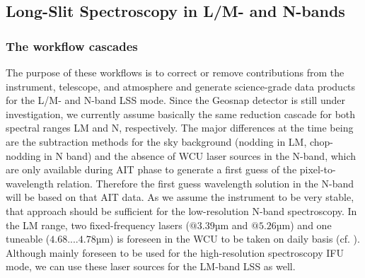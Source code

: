 \subsection{Long-Slit Spectroscopy in L/M- and N-bands}\label{lss:overview}
\subsubsection{The workflow cascades}\label{lss:cascade_overview}
The purpose of these workflows is to correct or remove contributions from
the instrument, telescope, and atmosphere and generate science-grade
data products for the L/M- and N-band \ac{LSS}
mode. Since the Geosnap detector is still under investigation, we currently assume basically the same reduction cascade for both spectral ranges LM and N, respectively. The major differences at the time being are the subtraction methods for the sky background (nodding in LM, chop-nodding in N band) and the absence of \ac{WCU} laser sources in the N-band, which are only available during \ac{AIT} phase to generate a first guess of the pixel-to-wavelength relation. Therefore the first guess wavelength solution in the N-band will be based on that \ac{AIT} data. As we assume the instrument to be very stable, that approach should be sufficient for the low-resolution N-band spectroscopy. In the LM range, two fixed-frequency lasers ($@3.39$µm and $@5.26$µm) and one tuneable ($4.68....4.78$µm) is foreseen in the \ac{WCU} to be taken on daily basis (cf. \cite{METIS-calibration_plan}). Although mainly foreseen to be used for the high-resolution spectroscopy \ac{IFU} mode, we can use these laser sources for the LM-band \ac{LSS} as well.

